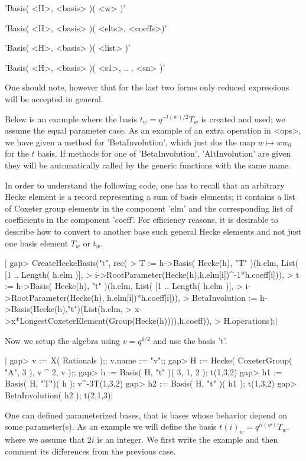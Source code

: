 'Basis( <H>, <basis> )( <w> )'

'Basis( <H>, <basis> )( <elts>, <coeffs>)'

'Basis( <H>, <basis> )( <list> )'

'Basis( <H>, <basis> )( <s1>, .. , <sn> )'

One   should note,  however  that  for the  last  two forms  only reduced
expressions will be accepted in general.

Below  is an  example where  the basis  $t_w=q^{-l(w)/2}T_w$ is created and
used;  we  assume  the  equal  parameter  case.  As  an example of an extra
operation in <ops>, we have given a method for 'BetaInvolution', which just
dos  the map  $w\mapsto w  w_0$ for  the $t$  basis. If  methods for one of
'BetaInvolution',  'AltInvolution'  are  given  they  will be automatically
called by the generic functions with the same name.

In  order  to  understand  the  following  code,  one has to recall that an
arbitrary  Hecke element is a record  representing a sum of basis elements;
it contains a list of Coxeter group elements in the component 'elm' and the
corresponding list of coefficients in the component 'coeff'. For efficiency
reasons,  it is desirable to  describe how to convert  to another base such
general Hecke elements and not just one basis element $T_w$ or $t_w$.

|    gap> CreateHeckeBasis("t", rec(
    >   T := h->Basis( Hecke(h), "T" )(h.elm, List( [1 .. Length( h.elm )],
    >      i->RootParameter(Hecke(h),h.elm[i])^-1*h.coeff[i])),
    >   t := h->Basis( Hecke(h), "t" )(h.elm, List( [1 .. Length( h.elm )],
    >      i->RootParameter(Hecke(h), h.elm[i])*h.coeff[i])),
    >   BetaInvolution := h->Basis(Hecke(h),"t")(List(h.elm,
    >    x->x*LongestCoxeterElement(Group(Hecke(h)))),h.coeff)),
    >    H.operations);|

Now we setup the algebra using $v=q^{1/2}$ and use the basis 't'.

|    gap> v := X( Rationals );; v.name := "v";;
    gap> H := Hecke( CoxeterGroup( "A", 3 ), v ^ 2, v );;
    gap> h := Basis( H, "t" )( 3, 1, 2 );
    t(1,3,2)
    gap> h1 := Basis( H, "T")( h );
    v^-3T(1,3,2)
    gap> h2 := Basis( H, "t" )( h1 );
    t(1,3,2)
    gap> BetaInvolution( h2 );
    t(2,1,3)|


One can defined parameterized bases, that is bases whose behavior depend on
some  parameter(s). As  an example  we will  define the  basis $t(i)_w=q^{i
l(w)}T_w$,  where we  assume that  $2i$ is  an integer.  We first write the
example and then comment its differences from the previous case.

